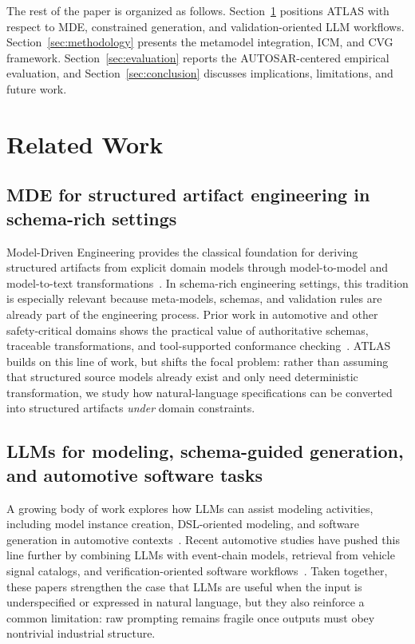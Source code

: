 \documentclass[acmlarge,nonacm]{acmart}
\theoremstyle{acmplain}
\theoremstyle{acmdefinition}
\begin{document}
The rest of the paper is organized as follows. Section~\ref{sec:related-work} positions ATLAS with respect to MDE, constrained generation, and validation-oriented LLM workflows. Section~\ref{sec:methodology} presents the metamodel integration, ICM, and CVG framework. Section~\ref{sec:evaluation} reports the AUTOSAR-centered empirical evaluation, and Section~\ref{sec:conclusion} discusses implications, limitations, and future work.


\section{Related Work}
\label{sec:related-work}

\subsection{MDE for structured artifact engineering in schema-rich settings}
Model-Driven Engineering provides the classical foundation for deriving structured artifacts from explicit domain models through model-to-model and model-to-text transformations~\cite{omg2003mda,kahaniSurveyClassificationModel2019,DualStageFramework}. In schema-rich engineering settings, this tradition is especially relevant because meta-models, schemas, and validation rules are already part of the engineering process. Prior work in automotive and other safety-critical domains shows the practical value of authoritative schemas, traceable transformations, and tool-supported conformance checking~\cite{delavaraModelbasedSpecificationSafety2016,el-gnainyAIEnhancedAUTOSARConfiguration2024a,nairExtendedSystematicLiterature2014}. ATLAS builds on this line of work, but shifts the focal problem: rather than assuming that structured source models already exist and only need deterministic transformation, we study how natural-language specifications can be converted into structured artifacts \emph{under} domain constraints.

\subsection{LLMs for modeling, schema-guided generation, and automotive software tasks}
A growing body of work explores how LLMs can assist modeling activities, including model instance creation, DSL-oriented modeling, and software generation in automotive contexts~\cite{Petrovic_2024,Alaoui2025,Patil2025,DiRocco2025LLMMDE}. Recent automotive studies have pushed this line further by combining LLMs with event-chain models, retrieval from vehicle signal catalogs, and verification-oriented software workflows~\cite{Kirchner2025AutoCode,Petrovic2025SurveyAutomotiveGenAI,Petrovic2025EventChainADAS}. Taken together, these papers strengthen the case that LLMs are useful when the input is underspecified or expressed in natural language, but they also reinforce a common limitation: raw prompting remains fragile once outputs must obey nontrivial industrial structure.
\end{document}
